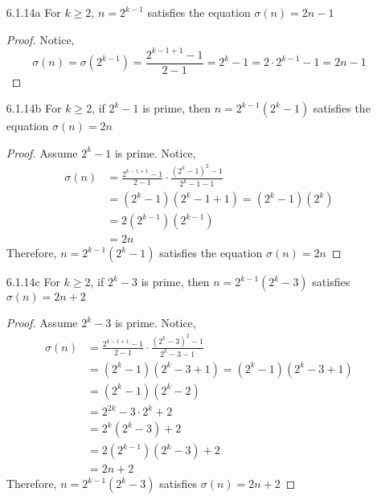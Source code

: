 \documentclass[12pt]{article}
\begin{document}
\begin{enumerate}
	\item[6.1.14a] For $ k \geq 2 $, $ n=2^{k-1} $ satisfies the equation $ \sigma(n)=2n-1 $
	\begin{proof}
	Notice,
	\[\sigma(n)=\sigma(2^{k-1})=\frac{2^{k-1+1}-1}{2-1}=2^k-1=2\cdot2^{k-1}-1=2n-1\]
	\end{proof}
	\item[6.1.14b] For $ k \geq 2 $, if $ 2^k-1 $ is prime, then $n=2^{k-1}(2^k-1)  $ satisfies the equation $ \sigma(n) = 2n $
	 \begin{proof}
	 Assume $ 2^k-1 $ is prime. Notice, 
	 \begin{align*}
	 \sigma(n)&=\frac{2^{k-1+1}-1}{2-1}\cdot\frac{(2^k-1)^2-1}{2^k-1-1}\\
	 		  &=(2^k-1)(2^k-1+1)=(2^k-1)(2^k)\\
	 		  &= 2(2^{k-1})(2^{k-1})\\
	 		  &= 2n
	 \end{align*}
	 	Therefore, $n=2^{k-1}(2^k-1)  $ satisfies the equation $ \sigma(n) = 2n $
	 \end{proof}
	\item[6.1.14c] For $ k \geq 2 $, if $ 2^k-3 $ is prime, then $n= 2^{k-1}(2^k-3) $ satisfies $ \sigma(n) = 2n+2 $
		 \begin{proof}
		Assume $ 2^k-3 $ is prime. Notice, 
		\begin{align*}
		\sigma(n)&=\frac{2^{k-1+1}-1}{2-1}\cdot\frac{(2^k-3)^2-1}{2^k-3-1}\\
		&=(2^k-1)(2^k-3+1)=(2^k-1)(2^k-3+1)\\
		&= (2^k-1)(2^k-2)\\
		&= 2^{2k}-3\cdot 2^k+2\\
		&= 2^k(2^k-3)+2\\
		&=2(2^{k-1})(2^k-3)+2\\
		&= 2n+2
		\end{align*}
		Therefore,  $n= 2^{k-1}(2^k-3) $ satisfies $ \sigma(n) = 2n+2 $
	\end{proof}
\end{enumerate}
\end{document}
